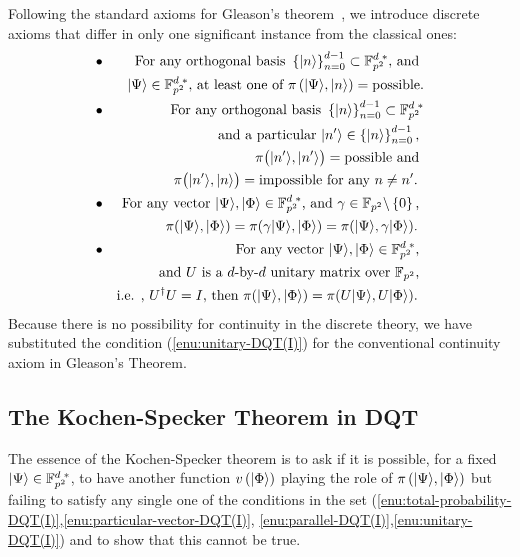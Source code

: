 \documentclass[english,12pt]{iopart}
\newcommand{\ff}[1]{\mathbb{F}_{#1}}
\newcommand{\ffzd}[1]{{\mathbb{F}^{d\;*}_{#1}}}
\newcommand{\dpr}{{\pi}}
\begin{document}
Following the standard axioms for Gleason's
theorem~\cite{peres1995quantum}, we introduce discrete axioms that
differ in only one significant instance from the classical ones:
\begin{eqnarray}
 & \bullet & \textrm{For any orthogonal basis }\left\{
  \left| n \right\rangle \right\}
  _{n=0}^{d-1}\subset\ffzd{p^{2}}\textrm{, and
  }\label{enu:total-probability-DQT(I)}\\ & &
  \ket{\Psi}\in\ffzd{p^{2}}\textrm{, at least one of\ }
  \dpr \left(\ket{\Psi},\ket{n}\right) = \text{possible.}\nonumber \\ &
  \bullet & \textrm{For any orthogonal basis }
\left\{  \left| n \right\rangle
\right\}_{n=0}^{d-1}\subset\ffzd{p^{2}}\nonumber \\ & &
 \textrm{and a particular\ }\ket{n'}\in\left\{ \left| n \right\rangle \right\}
  _{n=0}^{d-1}\textrm{, }\nonumber \\ & &
  \dpr\big(\ket{n'},\ket{n'}\big)=\text{possible and\ }
   \label{enu:particular-vector-DQT(I)}\\ & &
  \dpr\big(\ket{n'},\ket{n}\big)=\text{impossible for any }n\ne  n'
   \textrm{. }\nonumber \\ & \bullet & \textrm{For any vector  }
   \ket{\Psi},\ket{\Phi}\in\ffzd{p^{2}}
  \textrm{, and  }\gamma\in\ff{p^{2}}\backslash\left\{ 0\right\} 
  \textrm{, }\nonumber
  \\ & &
  \dpr (\ket{\Psi},\ket{\Phi})=\dpr (\gamma\ket{\Psi},\ket{\Phi}) = 
    \dpr (\ket{\Psi},\gamma\ket{\Phi}) \textrm{. }
  \label{enu:parallel-DQT(I)}\\
 & \bullet & \textrm{For any vector
  }\ket{\Psi},\ket{\Phi}\in\ffzd{p^{2}}
  \textrm{, }\nonumber \\ & &
  \textrm{and }U\textrm{ is a }d\textrm{-by-}d
  \textrm{ unitary matrix over }\ff{p^{2}}\textrm{, }
  \label{enu:unitary-DQT(I)}\\ & &
  \textrm{i.e. , }U^{\dagger}U=I\textrm{, then  }
   \dpr (\ket{\Psi},\ket{\Phi})=\dpr (U\ket{\Psi},U\ket{\Phi})\textrm{. }\nonumber
\end{eqnarray}
Because there is no possibility for continuity in the discrete theory,
we have substituted the condition (\ref{enu:unitary-DQT(I)}) for the
conventional continuity axiom in Gleason's Theorem.

\subsection {The Kochen-Specker Theorem in DQT}
The essence of the Kochen-Specker theorem is to ask if it is possible,
for a fixed $\ket{\Psi}\in\ffzd{p^{2}}$, to have another function
$v\left({\left\vert{\Phi}\right\rangle}\right)$ playing the role of
$\dpr \left(\ket{\Psi},\ket{\Phi}\right)$ but failing to satisfy any
single one of the conditions in the set
(\ref{enu:total-probability-DQT(I)},\ref{enu:particular-vector-DQT(I)},
\ref{enu:parallel-DQT(I)},\ref{enu:unitary-DQT(I)}) and to show that
this cannot be true.
  
\end{document}
